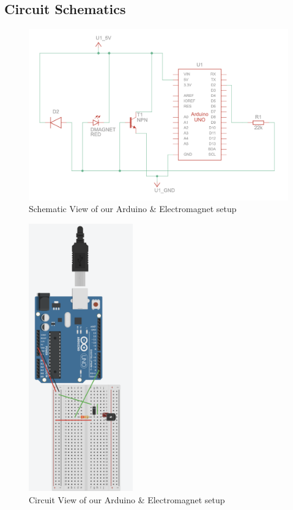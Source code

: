 \subsection{Circuit Schematics}
\begin{figure}[h!]
	\centering
 	\includegraphics[width=1.00\textwidth]{images/Circut Schematic View.png}
 \caption{Schematic View of our Arduino \& Electromagnet setup}
\end{figure}
\begin{figure}[h!]
	\centering
 	\includegraphics[width=0.40\textwidth]{images/Circut View.png}
 \caption{Circuit View of our Arduino \& Electromagnet setup}
\end{figure}